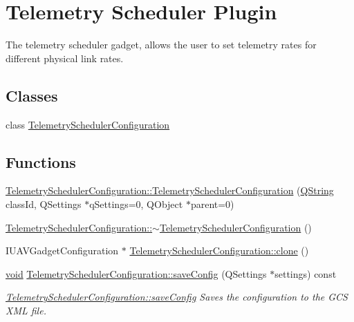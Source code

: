 \hypertarget{group___telemetry_scheduler}{\section{\-Telemetry \-Scheduler \-Plugin}
\label{group___telemetry_scheduler}
}


\-The telemetry scheduler gadget, allows the user to set telemetry rates for different physical link rates.  


\subsection*{\-Classes}
\begin{DoxyCompactItemize}
\item 
class \hyperlink{class_telemetry_scheduler_configuration}{\-Telemetry\-Scheduler\-Configuration}
\end{DoxyCompactItemize}
\subsection*{\-Functions}
\begin{DoxyCompactItemize}
\item 
\hyperlink{group___telemetry_scheduler_ga3b163cd7c5c2a5da472979be2e78dadd}{\-Telemetry\-Scheduler\-Configuration\-::\-Telemetry\-Scheduler\-Configuration} (\hyperlink{group___u_a_v_objects_plugin_gab9d252f49c333c94a72f97ce3105a32d}{\-Q\-String} class\-Id, \-Q\-Settings $\ast$q\-Settings=0, \-Q\-Object $\ast$parent=0)
\item 
\hyperlink{group___telemetry_scheduler_ga23cad1ffa0ae20024c6fa42fcc76c635}{\-Telemetry\-Scheduler\-Configuration\-::$\sim$\-Telemetry\-Scheduler\-Configuration} ()
\item 
\-I\-U\-A\-V\-Gadget\-Configuration $\ast$ \hyperlink{group___telemetry_scheduler_ga1cb06a537bf6e46691c183c5993e66ee}{\-Telemetry\-Scheduler\-Configuration\-::clone} ()
\item 
\hyperlink{group___u_a_v_objects_plugin_ga444cf2ff3f0ecbe028adce838d373f5c}{void} \hyperlink{group___telemetry_scheduler_ga9ccdf37f141feff3fd8b942d0bf2127f}{\-Telemetry\-Scheduler\-Configuration\-::save\-Config} (\-Q\-Settings $\ast$settings) const 
\begin{DoxyCompactList}\small\item\em \hyperlink{group___telemetry_scheduler_ga9ccdf37f141feff3fd8b942d0bf2127f}{\-Telemetry\-Scheduler\-Configuration\-::save\-Config} \-Saves the configuration to the \-G\-C\-S \-X\-M\-L file. \end{DoxyCompactList}\end{DoxyCompactItemize}


